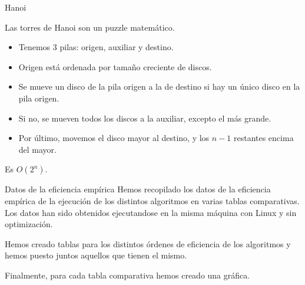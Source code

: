 \documentclass[spanish]{beamer}
\begin{document}
\begin{frame}{Hanoi}

	Las torres de Hanoi son un puzzle matemático.

	\vskip 0.5cm
	
	\begin{itemize}
		\item Tenemos 3 pilas: origen, auxiliar y destino.
		\item Origen está ordenada por tamaño creciente de discos.
		\item Se mueve un disco de la pila origen a la de destino si hay un único disco en la pila origen.
		\item Si no, se mueven todos los discos a la auxiliar, excepto el más grande.
		\item Por último, movemos el disco mayor al destino, y los $n-1$ restantes encima del mayor.
	\end{itemize}
	
	\vskip 0.5cm
	
	Es $O(2^n)$.
\end{frame}

\begin{frame}
	\begin{center}
		
	\end{center}
\end{frame}

\begin{frame}{Datos de la eficiencia empírica}
	Hemos recopilado los datos de la eficiencia empírica de la ejecución de los distintos algoritmos en varias tablas comparativas. Los datos han sido obtenidos ejecutandose en la misma máquina con Linux y sin optimización.
	
	\vskip 0.5cm
	
	Hemos creado tablas para los distintos órdenes de eficiencia de los algoritmos y hemos puesto juntos aquellos que tienen el mismo.
	
	\vskip 0.5cm
	
	Finalmente, para cada tabla comparativa hemos creado una gráfica.
	
\end{frame}


\burbujalinuxOCero
	\seleccionlinuxOCero
	\insercionlinuxOCero
	
\end{document}
